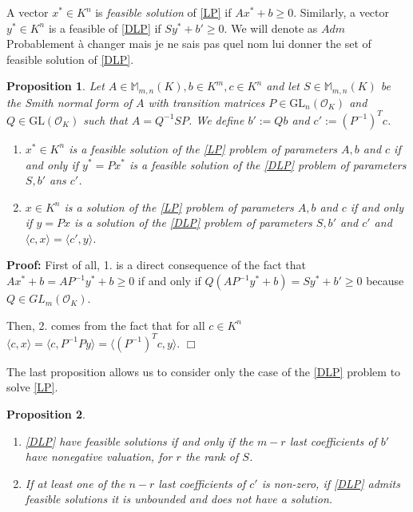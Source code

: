 \documentclass[a4paper,12pt]{article}
\newenvironment{proof}{\hbox{}\vspace{-0.8cm} {\bf Proof:}}{\hfill $\Box$}
\newtheorem{proposition}{Proposition}
\newcommand{\allmat}{\mathbb{M}} %
\newcommand{\corentin}[1]{{\color{red} #1}} %
\newcommand{\OK}{\mathcal{O}_K}
\newcommand{\GL}{\mathrm{GL}}
\begin{document}

A vector $x^* \in K^n$ is \emph{feasible solution} of \ref{LP} if $Ax^* + b \geq 0$. Similarly, a vector $y^* \in K^n$ is a feasible of \ref{DLP} if $Sy^*+b' \geq 0$. We will denote as $Adm$ \corentin{Probablement à changer mais je ne sais pas quel nom lui donner} the set of feasible solution of \ref{DLP}.

\begin{proposition} 
  Let $A \in \allmat_{m,n}(K), b \in K^m, c\in K^n$ and let $S \in \allmat_{m,n}(K)$ be the Smith normal form of $A$ with transition matrices $P \in \GL_n(\OK)$ and $Q\in \GL(\OK)$ such that $A=Q^{-1}SP$.
  We define $b':= Qb$ and $c':= (P^{-1})^Tc$. 
   \begin{enumerate}
    \item $x^* \in K^n$ is a feasible solution of the \ref{LP} problem of parameters $A, b$ and $c$ if and only if $y^* = P x^*$ is a feasible solution of the \ref{DLP} problem of parameters $S, b'$ ans $c'$.
		\item $x \in K^n$ is a solution of the \ref{LP} problem of parameters $A, b$ and $c$ if and only if $y = P x$ is a solution of the \ref{DLP} problem of parameters $S,b'$ and $c'$ and $\langle c,x \rangle = \langle c',y \rangle$.
   \end{enumerate}
\end{proposition}
\begin{proof}
  First of all, 1. is a direct consequence of the fact that $Ax^*+b = AP^{-1}y^* +b\geq 0$ if and only if $Q(AP^{-1}y^* + b) = Sy^* + b' \geq 0$ because $Q \in GL_m(\OK)$.

  Then, 2. comes from the fact that for all $c \in K^n$ $\langle c, x\rangle = \langle c, P^{-1}Py \rangle = \langle \left(P^{-1}\right)^T c, y \rangle$.
\end{proof}

The last proposition allows us to consider only the case of the \ref{DLP} problem to solve \ref{LP}.
\begin{proposition}\label{prop:reduc}
		\begin{enumerate}
		\item \ref{DLP} have feasible solutions if and only if the $m-r$ last coefficients of $b'$ have nonegative valuation, for $r$ the rank of $S$.
		\item If at least one of the $n-r$ last coefficients of $c'$ is non-zero, if \ref{DLP} admits feasible solutions it is unbounded and does not have a solution.
	 
  \end{enumerate}
\end{proposition}
	
\end{document}
